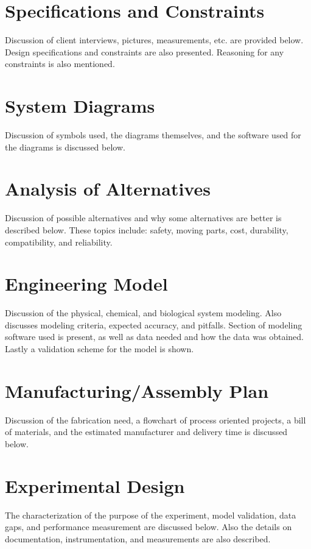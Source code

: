 \documentclass[12pt]{article}
\begin{document}
		\newpage	
	
	\section{Specifications and Constraints}
	Discussion of client interviews, pictures, measurements, etc. are provided below. Design specifications and constraints are also presented. Reasoning for any constraints is also mentioned.
	
		\newpage
						
	\section{System Diagrams}
	Discussion of symbols used, the diagrams themselves, and the software used for the diagrams is discussed below.
	
		\newpage				
					
	\section{Analysis of Alternatives}
	Discussion of possible alternatives and why some alternatives are better is described below. These topics include: safety, moving parts, cost, durability, compatibility, and reliability.
	
		\newpage
	
	\section{Engineering Model}
	Discussion of the physical, chemical, and biological system modeling. Also discusses modeling criteria, expected accuracy, and pitfalls. Section of modeling software used is present, as well as data needed and how the data was obtained. Lastly a validation scheme for the model is shown.
	
		\newpage
	
	\section{Manufacturing/Assembly Plan}
	Discussion of the fabrication need, a flowchart of process oriented projects, a bill of materials, and the estimated manufacturer and delivery time is discussed below.
	
		\newpage
	
	\section{Experimental Design}
	The characterization of the purpose of the experiment, model validation, data gaps, and performance measurement are discussed below. Also the details on documentation, instrumentation, and measurements are also described.
		
\end{document}
